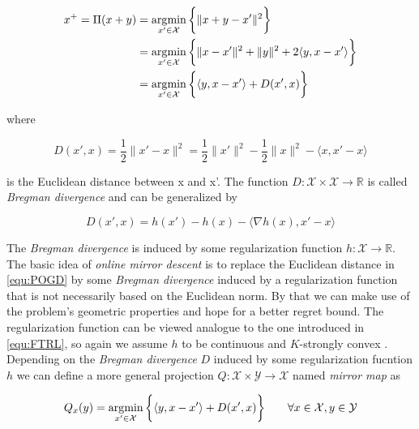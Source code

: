 \begin{equation}
\begin{split}
x^+ = \Pi(x + y) & = \operatorname*{\arg\!\min}_{x' \in \mathcal{X}}\bigg\{\|x + y - x'\|^2\bigg\} \\
 & = \operatorname*{\arg\!\min}_{x' \in \mathcal{X}}\bigg\{\|x - x'\|^2 + \|y\|^2 + 2\langle y,x-x'\rangle\bigg\} \\
 & = \operatorname*{\arg\!\min}_{x' \in \mathcal{X}}\bigg\{\langle y,x-x'\rangle + D(x',x)\bigg\}
\end{split}
\label{equ:EuclideanProj}
\end{equation}

where 

\begin{equation*}
    D(x',x) = \frac{1}{2}\|x'-x\|^2 = \frac{1}{2}\|x'\|^2 - \frac{1}{2}\|x\|^2 - \langle x,x'-x\rangle
\end{equation*}

is the Euclidean distance between x and x'. The function $D: \mathcal{X}\times\mathcal{X} \to \mathbb{R}$ is called \textit{Bregman divergence} and can be generalized by 

\begin{equation*}
    D(x',x) = h(x') - h(x) - \langle\nabla h(x), x'-x\rangle
\end{equation*}

The \textit{Bregman divergence} is induced by some regularization function $h: \mathcal{X} \to \mathbb{R}$. The basic idea of \textit{online mirror descent} is to replace the Euclidean distance in \ref{equ:POGD} by some \textit{Bregman divergence} induced by a regularization function that is not necessarily based on the Euclidean norm. By that we can make use of the problem's geometric properties and hope for a better regret bound. The regularization function can be viewed analogue to the one introduced in \ref{equ:FTRL}, so again we assume $h$ to be continuous and $K$-strongly convex \cite{HDRmertikopoulos}. \\

Depending on the \textit{Bregman divergence} $D$ induced by some regularization fucntion $h$ we can define a more general projection $Q:\mathcal{X}\times\mathcal{Y} \to \mathcal{X}$ named \textit{mirror map} as 

\begin{equation*}
    Q_x(y) = \operatorname*{\arg\!\min}_{x'\in \mathcal{X}}\bigg\{\langle y,x-x'\rangle + D(x',x)\bigg\} \qquad \forall x\in \mathcal{X}, y \in \mathcal{Y}
\end{equation*}

